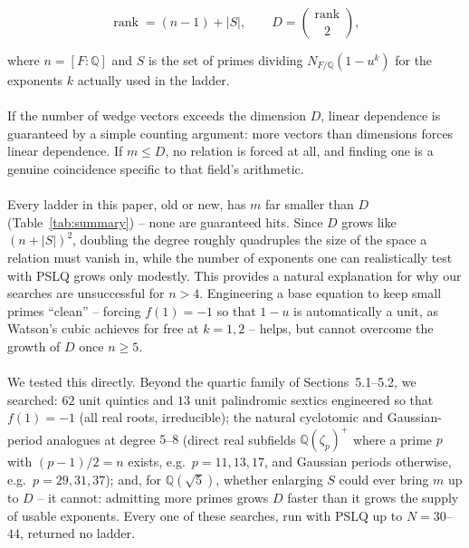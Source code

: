\documentclass[12pt]{article}
\begin{document}
{\begin{equation}
  \operatorname{rank} = (n-1) + |S|, \qquad D = \binom{\operatorname{rank}}{2},
  \label{eq:dim-formula}
\end{equation}

\noindent where $n=[F:\mathbb{Q}]$ and $S$ is the set of primes dividing $N_{F/\mathbb{Q}}(1-u^k)$ for the exponents $k$ actually used in the ladder.
\\
\\
\noindent If the number of wedge vectors exceeds the dimension $D$, linear dependence is guaranteed by a simple counting argument: more vectors than dimensions forces linear dependence. If $m\le D$, no relation is forced at all, and finding one is a genuine coincidence specific to that field's arithmetic.
\\
\\
\noindent Every ladder in this paper, old or new, has $m$ far smaller than $D$ (Table~\ref{tab:summary}) -- none are guaranteed hits. Since $D$ grows like $(n+|S|)^2$, doubling the degree roughly quadruples the size of the space a relation must vanish in, while the number of exponents one can realistically test with PSLQ grows only modestly. This provides a natural explanation for why our searches are unsuccessful for $n>4$. Engineering a base equation to keep small primes ``clean'' -- forcing $f(1)=-1$ so that $1-u$ is automatically a unit, as Watson's cubic achieves for free at $k=1,2$ -- helps, but cannot overcome the growth of $D$ once $n\ge5$.
\\
\\
\noindent We tested this directly. Beyond the quartic family of Sections~5.1--5.2, we searched: $62$ unit quintics and $13$ unit palindromic sextics engineered so that $f(1)=-1$ (all real roots, irreducible); the natural cyclotomic and Gaussian-period analogues at degree $5$--$8$ (direct real subfields $\mathbb{Q}(\zeta_p)^+$ where a prime $p$ with $(p-1)/2=n$ exists, e.g.\ $p=11,13,17$, and Gaussian periods otherwise, e.g.\ $p=29,31,37$); and, for $\mathbb{Q}(\sqrt5)$, whether enlarging $S$ could ever bring $m$ up to $D$ -- it cannot: admitting more primes grows $D$ faster than it grows the supply of usable exponents. Every one of these searches, run with PSLQ up to $N=30$--$44$, returned no ladder.

}
\end{document}
